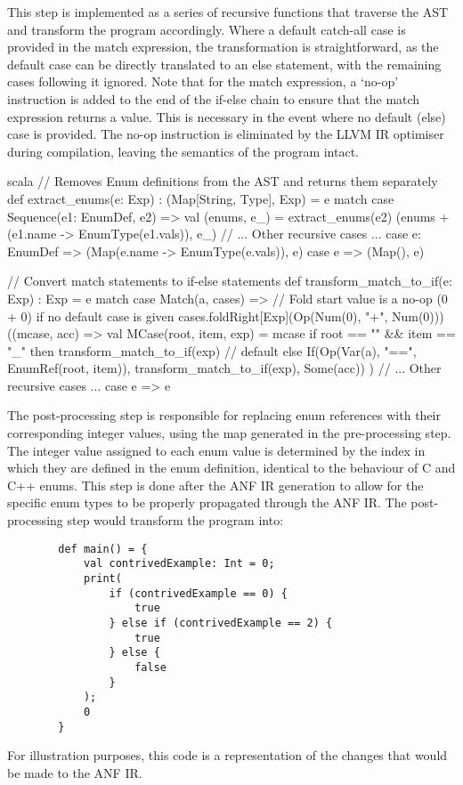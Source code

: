 This step is implemented as a series of recursive functions that traverse the AST and transform the
program accordingly. Where a default catch-all case is provided in the match expression, the
transformation is straightforward, as the default case can be directly translated to an else
statement, with the remaining cases following it ignored. Note that for the match expression, a
`no-op' instruction is added to the end of the if-else chain to ensure that the match expression
returns a value. This is necessary in the event where no default (else) case is provided. The no-op
instruction is eliminated by the LLVM IR optimiser during compilation, leaving the semantics of the
program intact.

\begin{code}{scala}
    // Removes Enum definitions from the AST and returns them separately
    def extract_enums(e: Exp) : (Map[String, Type], Exp) = e match {
        case Sequence(e1: EnumDef, e2) =>
            val (enums, e_) = extract_enums(e2)
            (enums + (e1.name -> EnumType(e1.vals)), e_)
        // ... Other recursive cases ...
        case e: EnumDef => (Map(e.name -> EnumType(e.vals)), e)
        case e => (Map(), e)
    }

    // Convert match statements to if-else statements
    def transform_match_to_if(e: Exp) : Exp = e match {
        case Match(a, cases) =>
            // Fold start value is a no-op (0 + 0) if no default case is given
            cases.foldRight[Exp](Op(Num(0), "+", Num(0)))((mcase, acc) => {
                val MCase(root, item, exp) = mcase
                if root == "" && item == "_" then
                    transform_match_to_if(exp)    // default
                else
                    If(Op(Var(a), "==", EnumRef(root, item)), transform_match_to_if(exp), Some(acc))
            })
        // ... Other recursive cases ...
        case e => e
    }
\end{code}

The post-processing step is responsible for replacing enum references with their corresponding
integer values, using the map generated in the pre-processing step. The integer value assigned to
each enum value is determined by the index in which they are defined in the enum definition,
identical to the behaviour of C and C++ enums. This step is done after the ANF IR generation to
allow for the specific enum types to be properly propagated through the ANF IR\@. The
post-processing step would transform the program into:

\begin{tcolorbox}
    \begin{verbatim}
        def main() = {
            val contrivedExample: Int = 0;
            print(
                if (contrivedExample == 0) {
                    true
                } else if (contrivedExample == 2) {
                    true
                } else {
                    false
                }
            );
            0
        }
    \end{verbatim}
    \tcblower
    \footnotesize
    For illustration purposes, this code is a representation of the changes that would be made to
    the ANF IR.
\end{tcolorbox}

